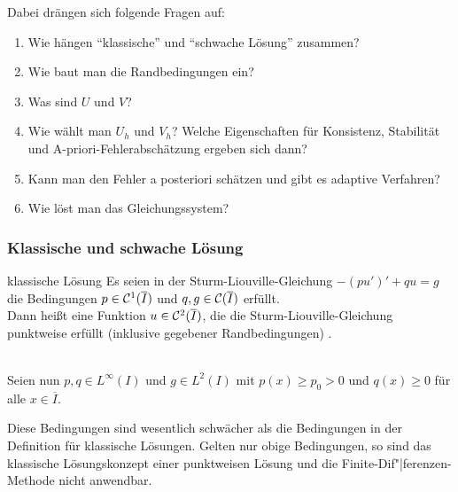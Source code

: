 \begin{Bem}
    Dabei drängen sich folgende Fragen auf:
    \begin{enumerate}
        \item
        Wie hängen "`klassische"' und "`schwache Lösung"' zusammen?
        
        \item
        Wie baut man die Randbedingungen ein?
        
        \item
        Was sind $U$ und $V$?
        
        \item
        Wie wählt man $U_h$ und $V_h$?
        Welche Eigenschaften für Konsistenz, Stabilität und
        A-priori-Fehlerabschätzung ergeben sich dann?
        
        \item
        Kann man den Fehler a posteriori schätzen und gibt es
        adaptive Verfahren?
        
        \item
        Wie löst man das Gleichungssystem?
    \end{enumerate}
\end{Bem}

\pagebreak

\subsubsection{%
    Klassische und schwache Lösung%
}

\begin{Def}{klassische Lösung}
    Es seien in der Sturm-Liouville-Gleichung $-(pu')' + qu = g$
    die Bedingungen $p \in \mathcal{C}^1(\overline{I})$ und
    $q, g \in \mathcal{C}(\overline{I})$ erfüllt.\\
    Dann heißt eine Funktion $u \in \mathcal{C}^2(\overline{I})$, die die
    Sturm-Liouville-Gleichung punktweise erfüllt
    (inklusive gegebener Randbedingungen)
    .
\end{Def}

\begin{Bem}\\
    Seien nun $p, q \in L^\infty(I)$ und $g \in L^2(I)$ mit
    $p(x) \ge p_0 > 0$ und $q(x) \ge 0$ für alle $x \in \overline{I}$.
\end{Bem}

\begin{Bem}
    Diese Bedingungen sind wesentlich schwächer als die Bedingungen
    in der Definition für klassische Lösungen.
    Gelten nur obige Bedingungen, so sind das klassische Lösungskonzept einer
    punktweisen Lösung und die Finite-Dif"|ferenzen-Methode nicht anwendbar.
\end{Bem}

